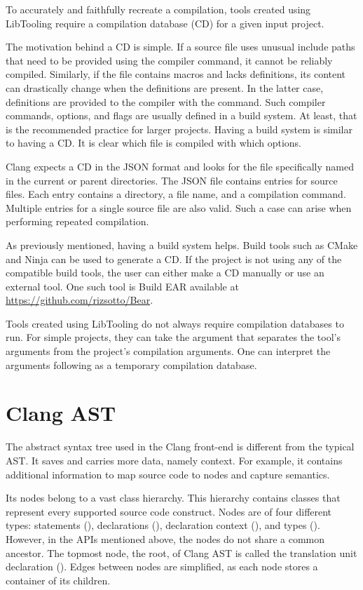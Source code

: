 To accurately and faithfully recreate a compilation, tools created using 
LibTooling require a compilation database (CD) for a given input project.

The motivation behind a CD is simple.
If a source file uses unusual include paths that need to be provided 
using the  compiler command, it cannot be reliably compiled.
Similarly, if the file contains macros and lacks definitions, its content 
can drastically change when the definitions are present.
In the latter case, definitions are provided to the compiler 
with the  command.
Such compiler commands, options, and flags are usually defined in a build 
system.
At least, that is the recommended practice for larger projects.
Having a build system is similar to having a CD.
It is clear which file is compiled with which options.

Clang expects a CD in the JSON format and looks for the file specifically
named   in the current or parent 
directories.
The JSON file contains entries for source files.
Each entry contains a directory, a file name, and a compilation command.
Multiple entries for a single source file are also valid.
Such a case can arise when performing repeated compilation.

As previously mentioned, having a build system helps.
Build tools such as CMake and Ninja can be used to generate a CD.
If the project is not using any of the compatible build tools, 
the user can either make a CD manually or use an external tool.
One such tool is Build EAR available at \url{https://github.com/rizsotto/Bear}.

Tools created using LibTooling do not always require compilation databases 
to run.
For simple projects, they can take the \icode{-{}-} argument that separates 
the tool's arguments from the project's compilation arguments.
One can interpret the arguments following \icode{-{}-} as a temporary
compilation database.

\section{Clang AST}

The abstract syntax tree used in the Clang front-end is different 
from the typical AST. 
It saves and carries more data, namely context.  
For example, it contains additional information to map source 
code to nodes and capture semantics. 

Its nodes belong to a vast class hierarchy. 
This hierarchy contains classes that represent every supported 
source code construct.
Nodes are of four different types: statements (), 
declarations (), declaration context (),
and types (). 
However, in the APIs mentioned above, the nodes do not share
a common ancestor. 
The topmost node, the root, of Clang AST is called the translation
unit declaration (). 
Edges between nodes are simplified, as each node stores 
a container of its children.

